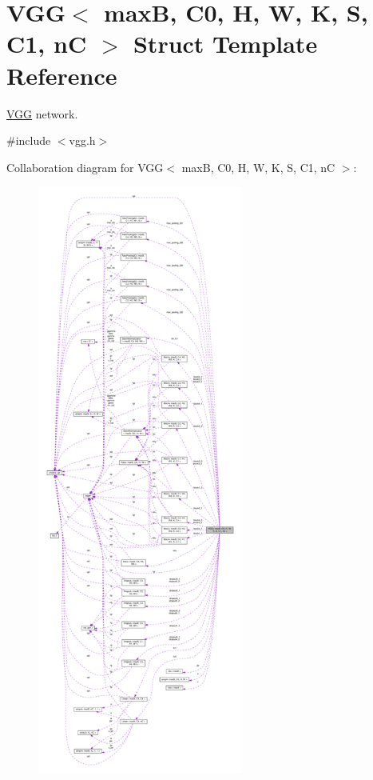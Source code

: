 \hypertarget{structVGG}{}\section{V\+GG$<$ maxB, C0, H, W, K, S, C1, nC $>$ Struct Template Reference}
\label{structVGG}


\hyperlink{structVGG}{V\+GG} network.  




{\ttfamily \#include $<$vgg.\+h$>$}



Collaboration diagram for V\+GG$<$ maxB, C0, H, W, K, S, C1, nC $>$\+:\nopagebreak
\begin{figure}[H]
\begin{center}
\leavevmode
\includegraphics[height=550pt]{structVGG__coll__graph}
\end{center}
\end{figure}
